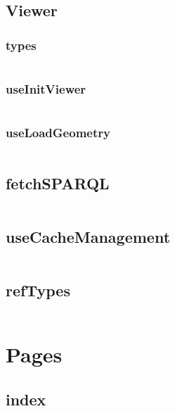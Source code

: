 \subsection{Viewer}
\subsubsection{types}
\inputminted{ts}{figures/snippets/src/modules/viewer/types.ts}
\subsubsection{useInitViewer}
\inputminted{ts}{figures/snippets/src/modules/viewer/useInitViewer.ts}
\subsubsection{useLoadGeometry}
\inputminted{ts}{figures/snippets/src/modules/viewer/useLoadGeometry.ts}
\subsection{fetchSPARQL}
\inputminted{ts}{figures/snippets/src/modules/fetchSPARQL.ts}
\subsection{useCacheManagement}
\inputminted{ts}{figures/snippets/src/modules/useCacheManagement.ts}
\subsection{refTypes}
\inputminted{ts}{figures/snippets/src/modules/refTypes.ts}

\section{Pages}
\subsection{index}
\inputminted{tsx}{figures/snippets/src/pages/index.tsx}
